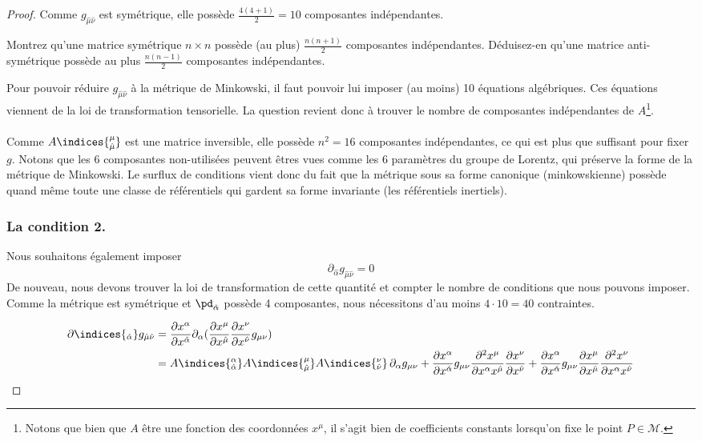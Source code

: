 \begin{proof}
Comme $g_{\hat{\mu}\hat{\nu}}$ est symétrique, elle possède $\frac{4 (4+1)}{2} = 10$ composantes indépendantes.
\begin{exerc}
    Montrez qu'une matrice symétrique $n \times n$ possède (au plus) $\frac{n(n+1)}{2}$ composantes indépendantes. Déduisez-en qu'une matrice anti-symétrique possède au plus $\frac{n(n-1)}{2}$ composantes indépendantes.
\end{exerc}
Pour pouvoir réduire $g_{\hat{\mu}\hat{\nu}}$ à la métrique de Minkowski, il faut pouvoir lui imposer (au moins) 10 équations algébriques. Ces équations viennent de la loi de transformation tensorielle. La question revient donc à trouver le nombre de composantes indépendantes de $A$\footnote{Notons que bien que $A$ être une fonction des coordonnées $x^\mu$, il s'agit bien de coefficients constants lorsqu'on fixe le point $P\in \mathcal{M}$.}.\\
\\
Comme $A\indices{_{\hat{\mu}}^{\mu}}$ est une matrice inversible, elle possède $n^2 = 16$ composantes indépendantes, ce qui est plus que suffisant pour fixer $g$. Notons que les 6 composantes non-utilisées peuvent êtres vues comme les 6 paramètres du groupe de Lorentz, qui préserve la forme de la métrique de Minkowski. Le surflux de conditions vient donc du fait que la métrique sous sa forme canonique (minkowskienne) possède quand même toute une classe de référentiels qui gardent sa forme invariante (les référentiels inertiels).

\subsubsection{La condition 2.}

Nous souhaitons également imposer
\begin{equation}
    \partial_{\hat{\alpha}}g_{\hat{\mu}\hat{\nu}} =0
\end{equation}
De nouveau, nous devons trouver la loi de transformation de cette quantité et compter le nombre de conditions que nous pouvons imposer. Comme la métrique est symétrique et $\pd_{\hat{\alpha}}$ possède 4 composantes, nous nécessitons d'au moins $4\cdot 10 = 40$ contraintes.

\begin{align}
\nonumber
   \partial\indices{_{\hat{\alpha}}}g_{\hat{\mu}\hat{\nu}} &= \frac{\partial x^{\alpha}}{\partial x^{\hat{\alpha}}}\partial_{\alpha}(\frac{\partial x^{\mu}}{\partial x^{\hat{\mu}}}\frac{\partial x^{\nu}}{\partial x^{\hat{\nu}}} g_{\mu \nu})\\
   &= A\indices{^{\alpha}_{\hat{\alpha}}} A\indices{^{\mu}_{\hat{\mu}}} A\indices{^{\nu}_{\hat{\nu}}}\, \partial_{\alpha} g_{\mu \nu} + \frac{\partial x^{\alpha}}{\partial x^{\hat{\alpha}}} g_{\mu \nu}\frac{\partial^2 x^{\mu}}{\partial x^{\alpha}x^{\hat{\mu}}}\frac{\partial x^{\nu}}{\partial x^{\hat{\nu}}} + \frac{\partial x^{\alpha}}{\partial x^{\hat{\alpha}}} g_{\mu \nu}\frac{\partial x^{\mu}}{\partial x^{\hat{\mu}}}\frac{\partial^2 x^{\nu}}{\partial x^{\alpha}x^{\hat{\nu}}}
\end{align}


\end{proof}
